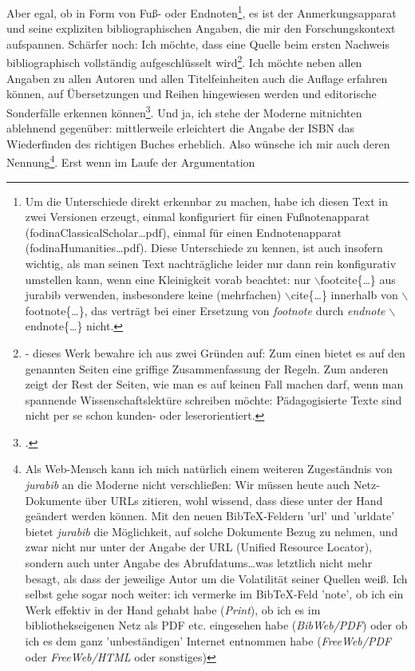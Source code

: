 Aber egal, ob in Form von Fuß- oder Endnoten\footnote{Um die Unterschiede direkt
erkennbar zu machen, habe ich diesen Text in zwei Versionen erzeugt, einmal
konfiguriert für einen Fußnotenapparat (fodinaClassicalScholar\ldots{}pdf),
einmal für einen Endnotenapparat (fodinaHumanities\ldots{}pdf). Diese
Unterschiede zu kennen, ist auch insofern wichtig, als man seinen Text
nachträgliche leider nur dann rein konfigurativ umstellen kann, wenn eine
Kleinigkeit vorab beachtet: nur $\backslash$footcite\{\ldots\} aus jurabib
verwenden, insbesondere keine (mehrfachen) $\backslash$cite\{\ldots\} innerhalb
von $\backslash$footnote\{\ldots\}, das verträgt bei einer Ersetzung von
\textit{footnote} durch \textit{endnote} $\backslash$endnote\{\ldots\} nicht.},
es ist der Anmerkungsapparat und seine expliziten bibliographischen Angaben, die
mir den Forschungskontext aufspannen. Schärfer noch: Ich möchte, dass eine
Quelle beim ersten Nachweis bibliographisch vollständig aufgeschlüsselt
wird\footnote{\cite[vgl.][195ff]{RueStaFra1980a} - dieses Werk bewahre ich aus
zwei Gründen auf: Zum einen bietet es auf den genannten Seiten eine griffige
Zusammenfassung der Regeln. Zum anderen zeigt der Rest der Seiten, wie man es
auf keinen Fall machen darf, wenn man spannende Wissenschaftslektüre schreiben
möchte: Pädagogisierte Texte sind nicht per se schon kunden- oder
leserorientiert. }. Ich möchte neben allen Angaben zu allen Autoren und allen
Titelfeinheiten auch die Auflage erfahren können, auf Übersetzungen und Reihen
hingewiesen werden und editorische Sonderfälle erkennen können\footcite[wie z.B.
bei][]{Covey2006a}. Und ja, ich stehe der Moderne mitnichten ablehnend
gegenüber: mittlerweile erleichtert die Angabe der ISBN das Wiederfinden des
richtigen Buches erheblich. Also wünsche ich mir auch deren Nennung\footnote{Als
Web-Mensch kann ich mich natürlich einem weiteren Zugeständnis von
\textit{jurabib} an die Moderne nicht verschließen: Wir müssen heute auch
Netz-Dokumente über URLs zitieren, wohl wissend, dass diese unter der Hand
geändert werden können. Mit den neuen BibTeX-Feldern 'url' und 'urldate' bietet
\textit{jurabib} die Möglichkeit, auf solche Dokumente Bezug zu nehmen, und zwar
nicht nur unter der Angabe der URL (Unified Resource Locator), sondern auch
unter Angabe des Abrufdatums\ldots was letztlich nicht mehr besagt, als dass der
jeweilige Autor um die Volatilität seiner Quellen weiß. Ich selbst gehe sogar
noch weiter: ich vermerke im BibTeX-Feld 'note', ob ich ein Werk effektiv in der
Hand gehabt habe (\textit{Print}), ob ich es im bibliothekseigenen Netz als PDF
etc. eingesehen habe (\textit{BibWeb/PDF}) oder ob ich es dem ganz
'unbeständigen' Internet entnommen habe (\textit{FreeWeb/PDF} oder
\textit{FreeWeb/HTML} oder sonstiges)}. Erst wenn im Laufe der Argumentation
